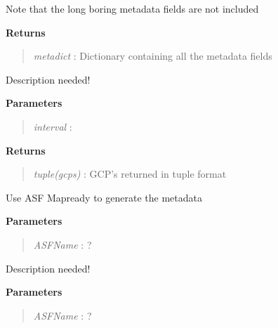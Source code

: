 \documentclass[letterpaper,10pt,openany,oneside]{sphinxmanual}
\begin{document}
\begin{fulllineitems}
\begin{fulllineitems}
Note that the long boring metadata fields are not included

\textbf{Returns}
\begin{quote}

\emph{metadict} : Dictionary containing all the metadata fields
\end{quote}

\end{fulllineitems}


\begin{fulllineitems}
\label{code:Metadata.Metadata.extractGCPs}
Description needed!

\textbf{Parameters}
\begin{quote}

\emph{interval}    :
\end{quote}

\textbf{Returns}
\begin{quote}

\emph{tuple(gcps)} : GCP's returned in tuple format
\end{quote}

\end{fulllineitems}


\begin{fulllineitems}
\label{code:Metadata.Metadata.getASFMetaCorners}
Use ASF Mapready to generate the metadata

\textbf{Parameters}
\begin{quote}

\emph{ASFName} : ?
\end{quote}

\end{fulllineitems}


\begin{fulllineitems}
\label{code:Metadata.Metadata.getASFProductType}
Description needed!

\textbf{Parameters}
\begin{quote}

\emph{ASFName} : ?
\end{quote}


\end{fulllineitems}
\end{fulllineitems}
\end{document}

